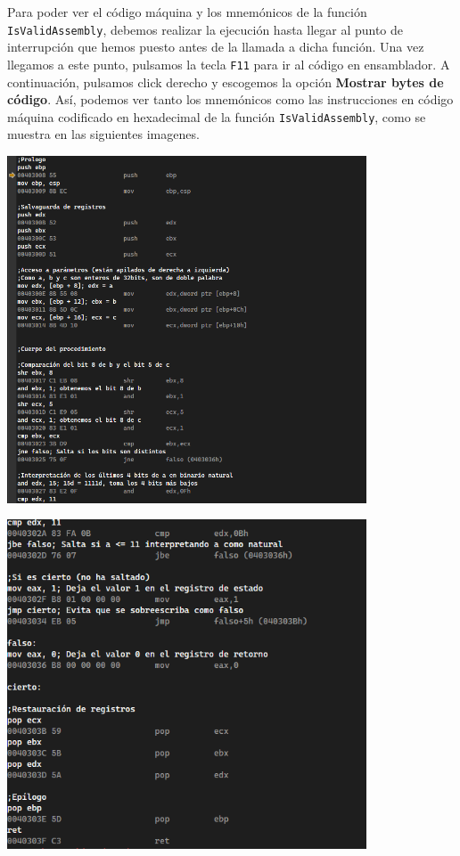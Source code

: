 \documentclass[11pt,a4paper]{article}
\begin{document}
\indent Para poder ver el código máquina y los mnemónicos de la función \texttt{IsValidAssembly}, debemos realizar la ejecución hasta llegar
al punto de interrupción que hemos puesto antes de la llamada a dicha función. Una vez llegamos a este punto, pulsamos la 
tecla \texttt{F11} para ir al código en ensamblador. A continuación, pulsamos click derecho y escogemos la opción \textbf{Mostrar bytes de código}. 
Así, podemos ver tanto los mnemónicos como las instrucciones en código máquina codificado en hexadecimal de la función \texttt{IsValidAssembly}, como se muestra en las siguientes imagenes.
\begin{center}
  \includegraphics[width=0.8\textwidth]{codigomaquina2.png}
  \end{center}
\begin{center}
  \includegraphics[width= 0.8\textwidth]{codigomaquina1 (1).png}
  \end{center}
\newpage
\end{document}
